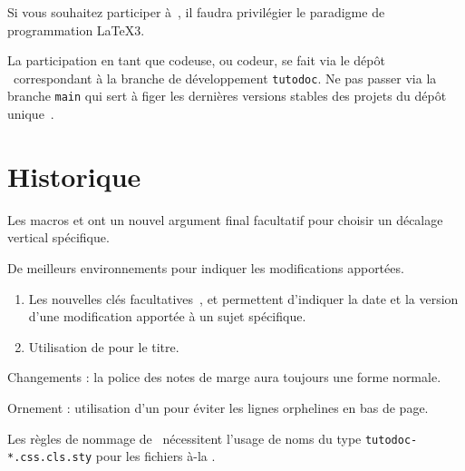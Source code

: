\begin{tdocimp}
    Si vous souhaitez participer à \thisproj\,, il faudra privilégier le paradigme de programmation \LaTeX3.
\end{tdocimp}


La participation en tant que codeuse, ou codeur, se fait via le dépôt \thisrepo\ correspondant à la branche de développement \verb#tutodoc#.
Ne pas passer via la branche \verb#main# qui sert à figer les dernières versions stables des projets du dépôt unique \thismonorepo\,.


\section{Historique}

\small

\begin{tdocnew}[version = 1.6.2, date = 2024-10-30]
	\item Les macros  et  ont un nouvel argument final facultatif  pour choisir un décalage vertical spécifique.

	\item De meilleurs environnements pour indiquer les modifications apportées.
	\begin{enumerate}
		\item Les nouvelles clés facultatives \,,  et  permettent d'indiquer la date et la version d'une modification apportée à un sujet spécifique.

		\item Utilisation de  pour le titre.
	\end{enumerate}
\end{tdocnew}


\begin{tdocupdate}
	\item Changements : la police des notes de marge aura toujours une forme normale.

	\item Ornement : utilisation d'un \tdocinlatex{\cleaders} pour éviter les lignes orphelines en bas de page.
\end{tdocupdate}

\tdocsep




\begin{tdoctech}[version = 1.6.1, date = 2024-10-28]
    \item Les règles de nommage de \ctan\ nécessitent l'usage de noms du type \verb+tutodoc-*.css.cls.sty+ pour les fichiers à-la .
\end{tdoctech}

